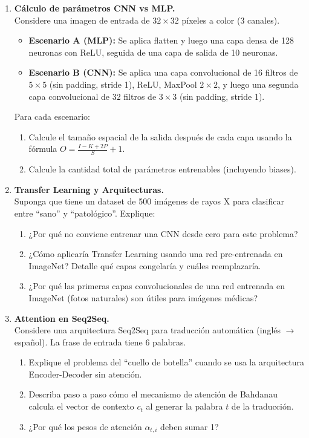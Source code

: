 \documentclass[12pt,a4paper]{article}
\begin{document}
\begin{enumerate}[label=\arabic*)]
    \item \textbf{Cálculo de parámetros CNN vs MLP.} \\
    Considere una imagen de entrada de $32 \times 32$ píxeles a color (3 canales).

    \begin{itemize}
        \item \textbf{Escenario A (MLP):} Se aplica flatten y luego una capa densa de 128 neuronas con ReLU, seguida de una capa de salida de 10 neuronas.
        \item \textbf{Escenario B (CNN):} Se aplica una capa convolucional de 16 filtros de $5 \times 5$ (sin padding, stride 1), ReLU, MaxPool $2 \times 2$, y luego una segunda capa convolucional de 32 filtros de $3 \times 3$ (sin padding, stride 1).
    \end{itemize}

    Para cada escenario:
    \begin{enumerate}[label=\alph*)]
        \item Calcule el tamaño espacial de la salida después de cada capa usando la fórmula $O = \frac{I - K + 2P}{S} + 1$.
        \item Calcule la cantidad total de parámetros entrenables (incluyendo biases).
    \end{enumerate}

    \item \textbf{Transfer Learning y Arquitecturas.} \\
    Suponga que tiene un dataset de 500 imágenes de rayos X para clasificar entre ``sano'' y ``patológico''. Explique:
    \begin{enumerate}[label=\alph*)]
        \item ¿Por qué no conviene entrenar una CNN desde cero para este problema?
        \item ¿Cómo aplicaría Transfer Learning usando una red pre-entrenada en ImageNet? Detalle qué capas congelaría y cuáles reemplazaría.
        \item ¿Por qué las primeras capas convolucionales de una red entrenada en ImageNet (fotos naturales) son útiles para imágenes médicas?
    \end{enumerate}

    \item \textbf{Attention en Seq2Seq.} \\
    Considere una arquitectura Seq2Seq para traducción automática (inglés $\to$ español). La frase de entrada tiene 6 palabras.
    \begin{enumerate}[label=\alph*)]
        \item Explique el problema del ``cuello de botella'' cuando se usa la arquitectura Encoder-Decoder sin atención.
        \item Describa paso a paso cómo el mecanismo de atención de Bahdanau calcula el vector de contexto $c_t$ al generar la palabra $t$ de la traducción.
        \item ¿Por qué los pesos de atención $\alpha_{t,i}$ deben sumar 1?
    \end{enumerate}
\end{enumerate}
\end{document}
